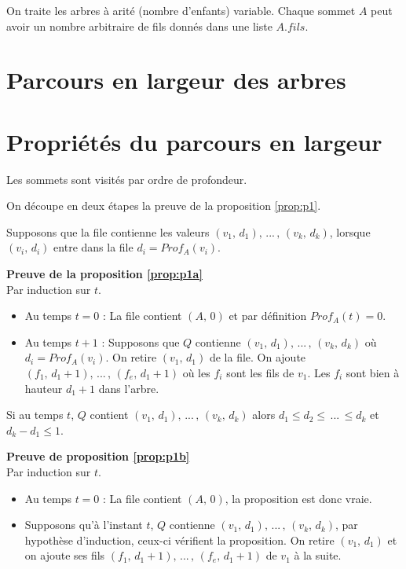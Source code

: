 On traite les arbres à arité (nombre d'enfants) variable. Chaque sommet $A$ peut avoir un nombre arbitraire de fils donnés dans une liste $A.fils$.

\section{Parcours en largeur des arbres} 



\section{Propriétés du parcours en largeur}

\begin{proposition}\label{prop:p1}
Les sommets sont visités par ordre de profondeur.
\end{proposition}
On découpe en deux étapes la preuve de la proposition \ref{prop:p1}.

\begin{proposition}\label{prop:p1a}
Supposons que la file contienne les valeurs $(v_{1},\, d_{1}),\, ...\, ,\, (v_{k},\, d_{k})$, lorsque $(v_{i},\, d_{i})$ entre dans la file $d_{i} = Prof_{A}(v_{i})$.
\end{proposition}

\textbf{\sffamily\small Preuve de la proposition \ref{prop:p1a}}\\
Par induction sur $t$.
\begin{itemize}
\item Au temps $t = 0$ : La file contient $(A,\, 0)$ et par définition $Prof_{A}(t) = 0$.

\item Au temps $t + 1$ : Supposons que $Q$ contienne $(v_{1},\, d_{1}),\, ...\, ,\,  (v_{k},\, d_{k})$ où $d_{i} = Prof_{A}(v_{i})$. On retire $(v_{1},\, d_{1})$ de la file. On ajoute $(f_{1},\, d_{1} + 1),\, ...\, ,\, (f_{e},\, d_{1} + 1)$ où les $f_{i}$ sont les fils de $v_{1}$. Les $f_{i}$ sont bien à hauteur $d_{1} + 1$ dans l'arbre.
\end{itemize}

\begin{proposition}\label{prop:p1b}
Si au temps $t$, $Q$ contient $(v_{1},\, d_{1}),\, ...\, ,\, (v_{k},\, d_{k})$ alors $d_{1} \leq d_{2} \leq \, ... \, \leq d_{k}$ et $d_{k} - d_{1} \leq 1$.
\end{proposition}

\textbf{\sffamily\small Preuve de proposition \ref{prop:p1b}}\\
Par induction sur $t$.
\begin{itemize}
\item Au temps $t = 0$ : La file contient $(A,\, 0)$, la proposition est donc vraie.
\item Supposons qu'à l'instant $t$, $Q$ contienne $(v_{1},\, d_{1}),\, ...\, ,\,  (v_{k},\, d_{k})$, par hypothèse d'induction, ceux-ci vérifient la proposition. On retire $(v_{1},\, d_{1})$ et on ajoute ses fils $(f_{1},\, d_{1} + 1),\, ...\, ,\, (f_{e},\, d_{1} + 1)$ de $v_{1}$ à la suite.
\end{itemize}

